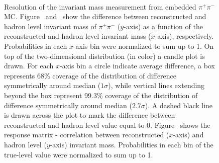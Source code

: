 \begin{figure}[h]
{  \centering
  \begin{subfigure}[b]{\linewidth}\addtocounter{subfigure}{-2}\vspace*{-12pt}
  \end{subfigure}\\
    \begin{minipage}[t][1.042\linewidth][t]{\linewidth}\vspace{10pt}
    \caption[Resolution of the invariant mass measurement from embedded $\pi^{+}\pi^{-}$ MC.]{Resolution of the invariant mass measurement from embedded $\pi^{+}\pi^{-}$ MC. Figure~ and~ show the difference between reconstructed and hadron level invariant mass of $\pi^{+}\pi^{-}$ ($y$-axis) as a function of the reconstructed and hadron level invariant mass ($x$-axis), respectively. Probabilities in each $x$-axis bin were normalized to sum up to 1. On top of the two-dimensional distribution (in color) a candle plot is drawn. For each $x$-axis bin a circle indicate average difference, a box represents 68\% coverage of the distribution of difference symmetrically around median ($1\sigma$), while vertical lines extending beyond the box represent 99.3\% coverage of the distribution of difference symmetrically around median ($2.7\sigma$). A dashed black line is drawn across the plot to mark the difference between reconstructed and hadron level value equal to 0. Figure~ shows the response matrix - correlation between reconstructed ($x$-axis) and hadron level ($y$-axis) invariant mass. Probabilities in each bin of the true-level value were normalized to sum up to 1.}\label{fig:Response_InvMass}%
  \end{minipage}
}%
\end{figure}


